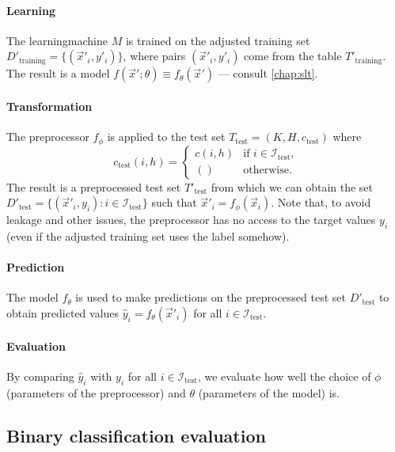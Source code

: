 \paragraph{Learning}

The \gls{learningmachine} $M$ is trained on the adjusted training set $D'_\text{training} =
\{(\vec{x}'_i, y'_i)\}$, where pairs $(\vec{x}'_i, y'_i)$ come from the table
$T'_\text{training}$.  The result is a \gls{model} $f(\vec{x}'; \theta) \equiv
f_\theta(\vec{x}')$ --- consult \cref{chap:slt}.

\paragraph{Transformation}

The \gls{preprocessor} $f_\phi$ is applied to the test set $T_\text{test} = (K, H,
c_\text{test})$ where \[
  c_\text{test}(i, h) = \begin{cases}
    c(i, h) & \text{if } i \in \mathcal{I}_\text{test}\text{,} \\
    () & \text{otherwise}\text{.}
  \end{cases}
\]  The result is a preprocessed test set $T'_\text{test}$ from which we can obtain the
set $D'_\text{test} = \{(\vec{x}'_i, y_i) : i \in \mathcal{I}_\text{test}\}$ such
that $\vec{x}'_i = f_\phi(\vec{x}_i)$.  Note that, to avoid \gls{leakage} and other
issues, the \gls{preprocessor} has no access to the target values $y_i$ (even if the
adjusted training set uses the label somehow).

\paragraph{Prediction}

The \gls{model} $f_\theta$ is used to make predictions on the preprocessed test set
$D'_\text{test}$ to obtain predicted values $\hat{y}_i = f_\theta(\vec{x}'_i)$ for all
$i \in \mathcal{I}_\text{test}$.

\paragraph{Evaluation}

By comparing $\hat{y}_i$ with $y_i$ for all $i \in \mathcal{I}_\text{test}$, we
evaluate how well the choice of $\phi$ (parameters of the \gls{preprocessor}) and $\theta$
(parameters of the \gls{model}) is.

\subsection{Binary classification evaluation}

